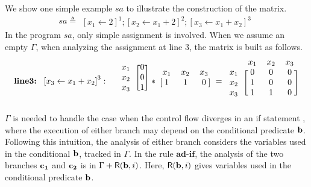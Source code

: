We show one simple example $sa$ to illustrate the construction of the matrix.     
\[
sa \triangleq
\begin{array}{l}
    \left[x_1 \leftarrow 2 \right]^1; 
    \left[x_2 \leftarrow x_1 + 2 \right]^2 ; 
    \left[x_3 \leftarrow x_1 + x_2 \right]^3
\end{array}
\]
In the program $sa$, only simple assignment is involved. When we assume an empty $\Gamma$, when analyzing the assignment at line $3$, the matrix is built as follows.
\[
\textbf{line3:} ~~
 \left[x_3 \leftarrow x_1 + x_2 \right]^3 :
 ~~~
\begin{blockarray}{cc}
\begin{block}{c[c]}
 x_1 & 0   \\
 x_2 & 0 \\
 x_3 & 1 \\
\end{block}
\end{blockarray}
*
\begin{blockarray}{ccc}
x_1 & x_2 & x_3 \\
\begin{block}{[ccc]}
1 & 1 & 0 \\
\end{block}
\end{blockarray}
= 
\begin{blockarray}{cccc}
& x_1 & x_2 & x_3\\
\begin{block}{c[ccc]}
x_1 & 0 & 0 & 0 \\
x_2 & 1 & 0 & 0 \\
x_3 & 1 & 1 & 0 \\
\end{block}
\end{blockarray}
\]
%
$\Gamma$ is needed to handle the case when the control flow diverges in an if statement
, where the execution of either branch may depend on the conditional predicate ${\bf{{b}}}$. Following this intuition, the analysis of either branch considers the variables used in the conditional ${\bf{{b}}}$, tracked in $\Gamma$. In the rule $\textbf{ad-if}$, the analysis of the two branches ${\bf{{c_1}}}$ and ${\bf{{c_2}}}$ is in $\Gamma + \mathsf{R}({\bf{{b}}}, i)$. Here, $\mathsf{R}({\bf{{b}}}, i) $ gives variables used in the conditional predicate ${\bf{{b}}}$.   

